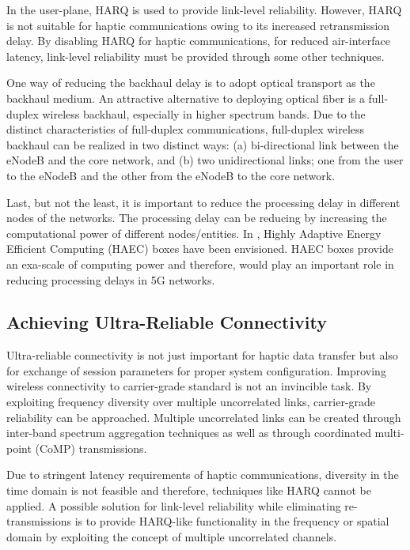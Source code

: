\documentclass[journal]{IEEEtran}
\begin{document}
In the user-plane, HARQ is used to provide link-level reliability. However, HARQ is not suitable for haptic communications owing to its increased retransmission delay. By disabling HARQ for haptic communications, for reduced air-interface latency, link-level reliability must be provided through some other techniques.


One way of reducing the backhaul delay is to adopt optical transport as the backhaul medium. An attractive alternative to deploying optical fiber is a full-duplex wireless backhaul, especially in higher spectrum bands. Due to the distinct characteristics of full-duplex communications, full-duplex wireless backhaul can be realized in two distinct ways: (a) bi-directional link between the eNodeB and the core network, and (b) two unidirectional links; one from the user to the eNodeB and the other from the eNodeB to the core network.

Last, but not the least, it is important to reduce the processing delay in different nodes of the networks. The processing delay can be reducing by increasing the computational power of different nodes/entities. In \cite{TI}, Highly Adaptive Energy Efficient Computing (HAEC) boxes have been envisioned. HAEC boxes provide an exa-scale of computing power and therefore, would play an important  role in reducing processing delays in 5G networks.




\subsection{Achieving Ultra-Reliable Connectivity}
Ultra-reliable connectivity is not just important for haptic data transfer but also for exchange of session parameters for proper system configuration. Improving wireless connectivity to carrier-grade standard is not an invincible task. By exploiting frequency diversity over multiple uncorrelated links, carrier-grade reliability can be approached. Multiple uncorrelated links can be  created through inter-band spectrum aggregation techniques as well as through coordinated multi-point (CoMP) \cite{CoMP} transmissions.



Due to stringent latency requirements of haptic communications, diversity in the time domain is not feasible and therefore, techniques like HARQ cannot be applied. A possible solution for link-level reliability while eliminating re-transmissions is to provide HARQ-like functionality in the frequency or spatial domain by exploiting the concept of multiple uncorrelated channels.
\end{document}
